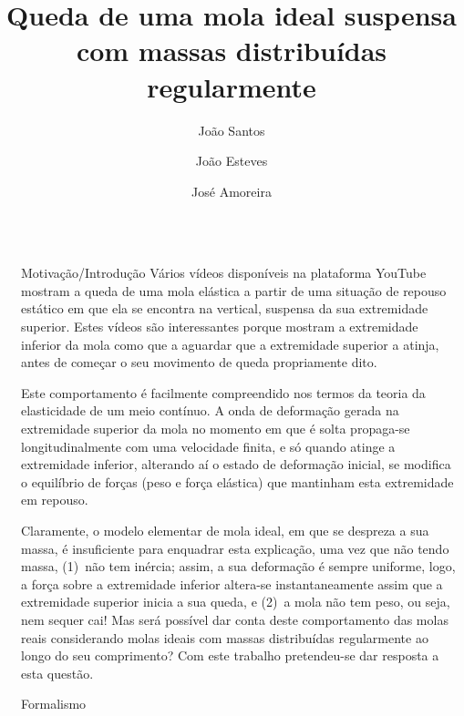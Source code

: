 \documentclass[final]{beamer}
\title{Queda de uma mola ideal suspensa com massas distribuídas regularmente}
\author{João Santos \inst{2} \and João Esteves \inst{2} \and José Amoreira \inst{1,2,3}}
\institute[]{\inst{1} Laboratório de Instrumentação e Física Experimental de Partículas \and \inst{2}Universidade da Beira Interior \samelineand \inst{3} Centro de Matemática e Aplicações (CMAUBI)}
\newlength{\sepwidth}
\newlength{\colwidth}
\newcommand{\separatorcolumn}{\begin{column}{\sepwidth}\end{column}}
\begin{document}
\begin{frame}[t]
\begin{columns}[t]
\separatorcolumn
\begin{column}{\colwidth}


\begin{exampleblock}{Motivação/Introdução}
  Vários vídeos disponíveis na plataforma YouTube \cite{YouTube,YouTub,YouTube2} mostram a queda de uma mola
  elástica a partir de uma situação de repouso estático em que ela se encontra
  na vertical, suspensa da sua extremidade superior. Estes vídeos são
  interessantes porque mostram a extremidade inferior da mola como que a aguardar
  que a extremidade superior a atinja, antes de começar o seu movimento de queda
  propriamente dito. 
	
  Este comportamento é facilmente compreendido nos termos da teoria da elasticidade de um meio
  contínuo. A onda de deformação gerada na extremidade superior da mola no momento em que é
  solta propaga-se longitudinalmente com uma velocidade finita, e só quando
  atinge a extremidade inferior, alterando aí o estado de deformação inicial, se
  modifica o equilíbrio de forças (peso e força elástica) que mantinham esta
  extremidade em repouso.
	
  Claramente, o modelo elementar de mola ideal, em que se despreza a sua massa,
  é insuficiente para enquadrar esta explicação, uma vez que não tendo massa,
  (1)~não tem inércia; assim, a sua deformação é sempre uniforme, logo, a força sobre a extremidade
  inferior altera-se instantaneamente assim que a extremidade superior inicia a
  sua queda, e (2)~a mola não tem peso, ou seja, nem sequer cai!
  Mas será possível dar conta deste comportamento das molas reais considerando
  molas ideais com massas distribuídas regularmente ao longo do seu
  comprimento? Com este trabalho pretendeu-se dar resposta a esta questão.
\end{exampleblock}


\begin{block}{Formalismo}
	\vspace{1cm}
	
\end{block}



\end{column}
\end{columns}
\end{frame}
\end{document}
